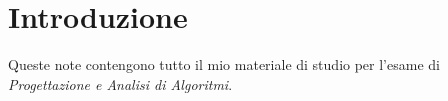 \section*{Introduzione}
Queste note contengono tutto il mio materiale di studio per l'esame di
\emph{Progettazione e Analisi di Algoritmi}.


